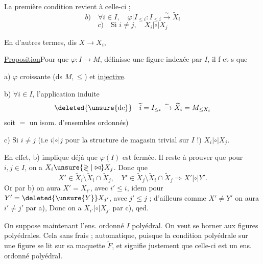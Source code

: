 La première condition revient à celle-ci ; 
\[
b)\quad\forall i\in I,\quad\varphi|I_{\leq i}:I_{\leq i}\xrightarrow{\sim}\widetilde X_i
\]
\[
c)\quad\text{Si }i\ne j,\quad X_i\mathrel{|\circ|}X_j
\]

En d'autres termes,  dis $X\longrightarrow X_i$,

\uline{Proposition}\quad Pour que $\varphi:I\longrightarrow M$, définisse une figure indexée par $I$, il f et s que

 a) $\varphi$  croissante (ds $M,\leq$) et \uline{injective}.

 b) $\forall i\in I$, l'application induite
\[
\deleted{\unsure{\mathrm{de}}}\quad\widetilde i=I_{\leq i}\xrightarrow{\sim}\widetilde X_i=M_{\leq X_i}
\]
soit  $=$ un isom. d'ensembles ordonnés)

 c) Si $i\ne j$ (i.e $i\mathrel{|\circ|}j$ pour la structure de magasin trivial sur $I$ !) \unsure{:} $X_i\mathrel{|\circ|}X_j$.

En effet, b) implique déjà que $\varphi(I)$ est fermée. Il reste à prouver que  pour $i,j\in I$, on a $X_i\unsure{\gtrless|\bowtie}X_j$. Donc que
\[
X'\in\widetilde X_i\setminus\widetilde X_i\cap\widetilde X_j,\quad Y'\in\widetilde X_j\setminus\widetilde X_i\cap\widetilde X_j\Longrightarrow X'\mathrel{|\circ|}Y'.
\]
Or par  b) on aura $X'=X_{i'}$, avec $i'\leq i$, idem pour $Y'=\deleted{\unsure{Y}}X_{j'}$, avec $j'\leq j$ ; d'ailleurs comme $X'\ne Y'$ on aura $i'\ne j'$ par a), Donc on a $X_{i'}\mathrel{|\circ|}X_{j'}$ par c), qed.

  On suppose maintenant l'ens. ordonné $I$ polyédral. On veut se borner aux figures polyédrales. Cela   sans frais ;   automatique, puisque la condition polyédrale sur une figure se lit sur sa maquette  $\widetilde F$, et signifie justement que celle-ci est un ens. ordonné polyédral.

